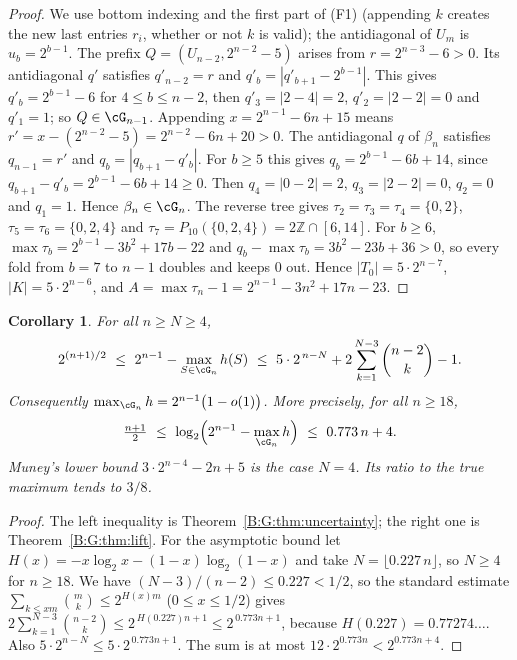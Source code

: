 \documentclass[11pt,a4paper]{article}
\newtheorem{corollary}[theorem]{Corollary}
\theoremstyle{definition}
\theoremstyle{remark}
\numberwithin{equation}{section}
\begin{document}
\begin{proof}
We use bottom indexing and the first part of (F1) (appending $k$ creates the new last entries $r_i$, whether or not $k$ is valid); the antidiagonal of $U_m$ is $u_b=2^{b-1}$. The prefix
$Q=(U_{n-2},2^{n-2}-5)$ arises from $r=2^{n-3}-6>0$. Its antidiagonal $q'$ satisfies
$q'_{n-2}=r$ and $q'_b=|q'_{b+1}-2^{b-1}|$. This gives $q'_b=2^{b-1}-6$ for $4\le b\le n-2$,
then $q'_3=|2-4|=2$, $q'_2=|2-2|=0$ and $q'_1=1$; so $Q\in\cG_{n-1}$. Appending
$x=2^{n-1}-6n+15$ means $r'=x-(2^{n-2}-5)=2^{n-2}-6n+20>0$. The antidiagonal $q$ of
$\beta_n$ satisfies $q_{n-1}=r'$ and $q_b=|q_{b+1}-q'_b|$. For $b\ge5$ this gives
$q_b=2^{b-1}-6b+14$, since $q_{b+1}-q'_b=2^{b-1}-6b+14\ge0$. Then $q_4=|0-2|=2$,
$q_3=|2-2|=0$, $q_2=0$ and $q_1=1$. Hence $\beta_n\in\cG_n$. The reverse tree gives
$\tau_2=\tau_3=\tau_4=\{0,2\}$, $\tau_5=\tau_6=\{0,2,4\}$ and
$\tau_7=P_{10}(\{0,2,4\})=2\mathbb{Z}\cap[6,14]$. For $b\ge6$,
$\max\tau_b=2^{b-1}-3b^2+17b-22$ and $q_b-\max\tau_b=3b^2-23b+36>0$, so every fold from $b=7$
to $n-1$ doubles and keeps $0$ out. Hence $|T_0|=5\cdot2^{n-7}$, $|K|=5\cdot2^{n-6}$, and
$A=\max\tau_n-1=2^{n-1}-3n^2+17n-23$.
\end{proof}

\begin{corollary}\label{B:G:cor:defect}
For all $n\ge N\ge4$,
\[
 2^{(n+1)/2}\ \le\ 2^{n-1}-\max_{S\in\cG_n}h(S)\ \le\
 5\cdot2^{\,n-N}+2\sum_{k=1}^{N-3}\binom{n-2}{k}-1 .
\]
Consequently $\max_{\cG_n}h=2^{n-1}\bigl(1-o(1)\bigr)$. More precisely, for all $n\ge18$,
\[
 \tfrac{n+1}{2}\ \le\ \log_2\Bigl(2^{n-1}-\max_{\cG_n}h\Bigr)\ \le\ 0.773\,n+4 .
\]
Muney's lower bound $3\cdot2^{n-4}-2n+5$ is the case $N=4$. Its ratio to the true maximum tends
to $3/8$.
\end{corollary}

\begin{proof}
The left inequality is Theorem~\ref{B:G:thm:uncertainty}; the right one is
Theorem~\ref{B:G:thm:lift}. For the asymptotic bound let $H(x)=-x\log_2x-(1-x)\log_2(1-x)$ and
take $N=\lfloor0.227\,n\rfloor$, so $N\ge4$ for $n\ge18$. We have
$(N-3)/(n-2)\le0.227<1/2$, so the standard estimate $\sum_{k\le xm}\binom mk\le2^{H(x)m}$
($0\le x\le1/2$) gives $2\sum_{k=1}^{N-3}\binom{n-2}{k}\le2^{\,H(0.227)n+1}\le2^{\,0.773n+1}$,
because $H(0.227)=0.77274\ldots$. Also $5\cdot2^{n-N}\le5\cdot2^{\,0.773n+1}$. The sum is at
most $12\cdot2^{0.773n}<2^{0.773n+4}$.
\end{proof}
\end{document}
